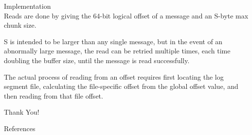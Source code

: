 \begin{frame}[plain,t]{Implementation} %
     \\
    \vspace{2ex}
    Reads are done by giving the 64-bit logical offset of a message and an S-byte max chunk size.
    
    \vspace{2ex}
    S is intended to be larger than any single message, but in the event of an abnormally large message, the read can be retried multiple times, each time doubling the buffer size, until the message is read successfully.
    
    \vspace{2ex}
    The actual process of reading from an offset requires first locating the log segment file, calculating the file-specific offset from the global offset value, and then reading from that file offset. 
    
    
    
\end{frame}



\begin{frame}[plain]
    \huge
    \vfill
    \centerline{  }
    \vfill
    
\end{frame}
\begin{frame}[plain]
    \huge
    \vfill
    \centerline{  }
    \vfill
    \Huge
    \centerline{\alert{Thank You!} }
    \vfill
\end{frame}

\begin{frame}{References}
\end{frame}  
 
